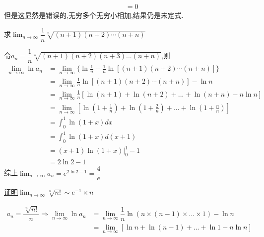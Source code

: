 \documentclass[8pt a4paper, oneside, UTF8]{ctexbook}
\begin{document}
\begin{sloppypar}
\begin{note}
\begin{align*}
                                       & =0
        \end{align*}
        但是这显然是错误的,无穷多个无穷小相加,结果仍是未定式.
    \end{note}
    \begin{problem}
    求$\lim_{n\to\infty}\dfrac{1}{n}\sqrt[n]{(n+1)(n+2)\cdots(n+n)}$
    \end{problem}
    \begin{solution}
        令$a_n=\dfrac{1}{n}\sqrt[n]{(n+1)(n+2)(n+3)...(n+n)}$,则
        \begin{align*}
            \lim_{n \to \infty}\ln a_n & = \lim_{n \to \infty} \{ \ln\frac{1}{n}+\frac{1}{n} \ln[(n+1)(n+2)\cdots(n+n)]\}   \\
                                       & = \lim_{n\to \infty}\frac{1}{n} \ln[(n+1)(n+2)\cdots(n+n)]- \ln n                  \\
                                       & = \lim_{n \to \infty}\frac{1}{n}[\ln(n+1)+\ln(n+2)+...+\ln(n+n)-n\ln n]            \\
                                       & = \lim_{n\to \infty}[\ln(1+\frac{1}{n})+\ln(1+\frac{2}{n})+...+\ln(1+\frac{n}{n})] \\
                                       & = \int_0^1 \ln(1+x)dx                                                              \\
                                       & = \int_0^1 \ln(1+x)d(x+1)                                                          \\
                                       & = (x+1)\ln(1+x)|_0^1 -1                                                            \\
                                       & = 2\ln2 -1
        \end{align*}
        综上$\lim_{n\to \infty}a_n=e^{2\ln2-1}=\dfrac{4}{e}$
    \end{solution}
    \begin{problem}
    \uline{证明$\lim_{n\to \infty}\sqrt[n]{n!}\sim e^{-1}\times n$}
    \end{problem}
    \begin{solution}
        \begin{align*}
            a_n=\dfrac{\sqrt[n]{n!}}{n} \Rightarrow \lim_{n\to \infty}\ln a_n & =\lim_{n\to \infty}\dfrac{1}{n}\ln(n\times (n-1)\times ...\times 1)-\ln n             \\
                                                                              & =  \lim_{n \to \infty}[\ln n+\ln(n-1)+...+\ln 1-n\ln n]                               \\

\end{align*}
\end{solution}
\end{sloppypar}
\end{document}
